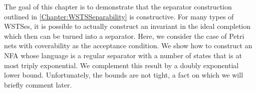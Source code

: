 \documentclass[../../diss.tex]{subfiles}
\begin{document}
The goal of this chapter is to demonstrate that the separator construction outlined in \cref{Chapter:WSTSSeparability} is constructive.
For many types of WSTSes, it is possible to actually construct an invariant in the ideal completion which then can be turned into a separator.
Here, we consider the case of Petri nets with coverability as the acceptance condition.
We show how to construct an NFA whose language is a regular separator with a number of states that is at most triply exponential.
We complement this result by a doubly exponential lower bound.
Unfortunately, the bounds are not tight, a fact on which we will briefly comment later.
\end{document}

